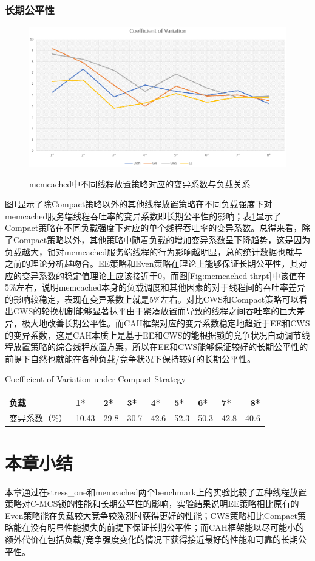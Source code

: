 \subsubsection{长期公平性}
\begin{figure}[t]
	\centering
	\includegraphics[width=5.6in]{figure/memcached-cv.PNG}
	\caption{memcached中不同线程放置策略对应的变异系数与负载关系}{}
	\label{Fig:memcached-fairness}
\end{figure}


图\ref{Fig:memcached-fairness}显示了除Compact策略以外的其他线程放置策略在不同负载强度下对memcached服务端线程吞吐率的变异系数即长期公平性的影响；表\ref{tab:CV-Compact}显示了Compact策略在不同负载强度下对应的单个线程吞吐率的变异系数。总得来看，除了Compact策略以外，其他策略中随着负载的增加变异系数呈下降趋势，这是因为负载越大，锁对memcached服务端线程的行为影响越明显，总的统计数据也就与之前的理论分析越吻合。EE策略和Even策略在理论上能够保证长期公平性，其对应的变异系数的稳定值理论上应该接近于0，而图\ref{Fig:memcached-thrpt}中该值在5\%左右，说明memcached本身的负载调度和其他因素的对于线程间的吞吐率差异的影响较稳定，表现在变异系数上就是5\%左右。对比CWS和Compact策略可以看出CWS的轮换机制能够显著抹平由于紧凑放置而导致的线程之间吞吐率的巨大差异，极大地改善长期公平性。而CAH框架对应的变异系数稳定地趋近于EE和CWS的变异系数，这是CAH本质上是基于EE和CWS的能根据锁的竞争状况自动调节线程放置策略的综合线程放置方案，所以在EE和CWS能够保证较好的长期公平性的前提下自然也就能在各种负载/竞争状况下保持较好的长期公平性。
\begin{table}[H]
  \centering
    {Coefficient of Variation under Compact Strategy}
  \label{tab:CV-Compact}
  \begin{tabular}{@{}llllllllr@{}} \toprule
    负载 & 1* & 2* & 3* & 4* & 5* & 6* & 7* & 8*\\ \midrule
    变异系数（\%）	&10.43	&29.8	& 30.7	& 42.6	& 52.3 &50.3 &42.8 &40.6 \\
  \end{tabular}
\end{table}
\section{本章小结}
本章通过在stress\_one和memcached两个benchmark上的实验比较了五种线程放置策略对C-MCS锁的性能和长期公平性的影响，实验结果说明EE策略相比原有的Even策略能在负载较大竞争较激烈时获得更好的性能；CWS策略相比Compact策略能在没有明显性能损失的前提下保证长期公平性；而CAH框架能以尽可能小的额外代价在包括负载/竞争强度变化的情况下获得接近最好的性能和可靠的长期公平性。